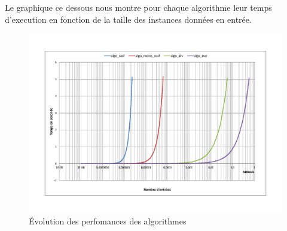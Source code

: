 \documentclass[11pt, a4paper]{article}
\begin{document}
Le graphique ce dessous nous montre pour chaque algorithme leur temps
d'execution en fonction de la taille des instances données en entrée.

\begin{figure}[h]
\includegraphics [scale=0.5]{images/comparatif.png}
\caption{Évolution des perfomances des algorithmes}
\label{courbe}
\end{figure}
\end{document}
